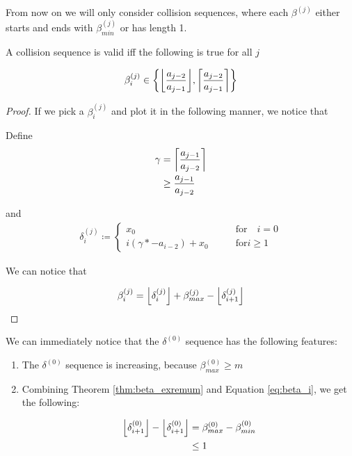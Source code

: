 From now on we will only consider collision sequences, where each $\beta^{(j)}$ either starts and ends with $\beta^{(j)}_{min}$ or has length 1.

\begin{theorem}\label{thm:beta_i}
	A collision sequence is valid iff the following is true for all $j$

	\begin{equation}
		\beta^{(j)}_i \in \cbracket{\floor{\frac{a_{j-2}}{a_{j-1}}}, \ceil{\frac{a_{j-2}}{a_{j-1}}}}
	\end{equation}
\end{theorem}

\begin{proof}
	If we pick a $\beta^{(j)}_i$ and plot it in the following manner, we notice that  

	Define
	\begin{align}
		\gamma& = \ceil{\frac{a_{j-1}}{a_{j-2}}}\\
		& \ge \frac{a_{j-1}}{a_{j-2}}
	\end{align}


	and
	\begin{align}\label{delta_beta}
			\delta^{(j)}_i \coloneqq \begin{cases}
				x_0 \qquad &\text{for} \quad i = 0\\
				i (\gamma *  - a_{i-2}) + x_0 \qquad &\text{for} i \ge 1
			\end{cases}
	\end{align}

	We can notice that

	\begin{align}\label{eq:beta_i}
		\beta^{(j)}_i = \floor{\delta^{(j)}_i} + \beta^{(j)}_{max} - \floor{\delta^{(j)}_{i+1}}
	\end{align}
\end{proof}

We can immediately notice that the $\delta^{(0)}$ sequence has the following features:

\begin{enumerate}
	\item The $\delta^{(0)}$ sequence is increasing, because $\beta^{(0)}_{max} \ge m$
	\item Combining Theorem \ref{thm:beta_exremum} and Equation \ref{eq:beta_i}, we get the following:

		\begin{align}
			\floor{\delta^{(0)}_{i+1}} - \floor{\delta^{(0)}_{i+1}}& = \beta^{(0)}_{max} - \beta^{(0)}_{min}\\
			& \le 1
		\end{align}
\end{enumerate}

